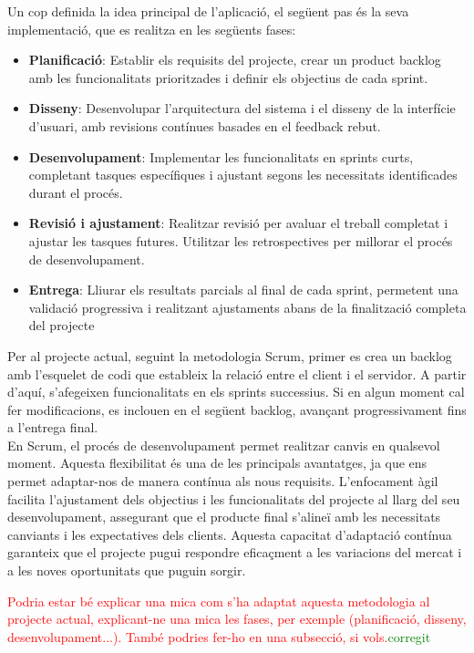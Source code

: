 \documentclass[a4paper,12pt,twoside]{ThesisStyle}
\newcommand{\pau}[1]{\textcolor{red}{#1}}
\newcommand{\sudan}[1]{\textcolor{green}{#1}}
\begin{document}
Un cop definida la idea principal de l'aplicació, el següent pas és la seva implementació, que es realitza en les següents fases:

\begin{itemize} 
    \item \textbf{Planificació}: Establir els requisits del projecte, crear un product backlog amb les funcionalitats prioritzades i definir els objectius de cada sprint.
    \item \textbf{Disseny}: Desenvolupar l'arquitectura del sistema i el disseny de la interfície d'usuari, amb revisions contínues basades en el feedback rebut. 
    \item \textbf{Desenvolupament}: Implementar les funcionalitats en sprints curts, completant tasques específiques i ajustant segons les necessitats identificades durant el procés. 
    \item \textbf{Revisió i ajustament}: Realitzar revisió per avaluar el treball completat i ajustar les tasques futures. Utilitzar les retrospectives per millorar el procés de desenvolupament. 
    \item \textbf{Entrega}: Lliurar els resultats parcials al final de cada sprint, permetent una validació progressiva i realitzant ajustaments abans de la finalització completa del projecte
\end{itemize}

Per al projecte actual, seguint la metodologia Scrum, primer es crea un backlog amb l'esquelet de codi que estableix la relació entre el client i el servidor. A partir d'aquí, s'afegeixen funcionalitats en els sprints successius. Si en algun moment cal fer modificacions, es inclouen en el següent backlog, avançant progressivament fins a l'entrega final.\\

En Scrum, el procés de desenvolupament permet realitzar canvis en qualsevol moment. Aquesta flexibilitat és una de les principals avantatges, ja que ens permet adaptar-nos de manera contínua als nous requisits. L'enfocament àgil facilita l'ajustament dels objectius i les funcionalitats del projecte al llarg del seu desenvolupament, assegurant que el producte final s'alineï amb les necessitats canviants i les expectatives dels clients. Aquesta capacitat d'adaptació contínua garanteix que el projecte pugui respondre eficaçment a les variacions del mercat i a les noves oportunitats que puguin sorgir.



\pau{Podria estar bé explicar una mica com s'ha adaptat aquesta metodologia al projecte actual, explicant-ne una mica les fases, per exemple (planificació, disseny, desenvolupament...). També podries fer-ho en una subsecció, si vols.}\sudan{corregit}
\end{document}
